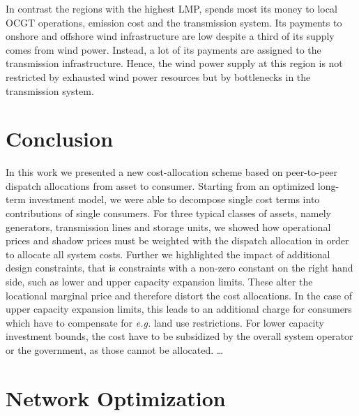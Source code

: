 \documentclass[11pt,twocolumn]{article}
\newcommand{\eg}{\textit{e.g.} }
\begin{document}
In contrast the regions with the highest LMP, spends most its money to local OCGT operations, emission cost and the transmission system. Its payments to  onshore and offshore wind infrastructure are low despite a third of its supply comes from wind power. Instead, a lot of its payments are assigned to the transmission infrastructure. Hence, the wind power supply at this region is not restricted by exhausted wind power resources but by bottlenecks in the transmission system.  

 


\section{Conclusion}

In this work we presented a new cost-allocation scheme based on peer-to-peer dispatch allocations from asset to consumer. Starting from an optimized long-term investment model, we were able to decompose single cost terms into contributions of single consumers. For three typical classes of assets, namely generators, transmission lines and storage units, we showed how operational prices and shadow prices must be weighted with the dispatch allocation in order to allocate all system costs. Further we highlighted the impact of additional design constraints, that is constraints with a non-zero constant on the right hand side, such as lower and upper capacity expansion limits. These alter the locational marginal price and therefore distort the cost allocations. In the case of upper capacity expansion limits, this leads to an additional charge for consumers which have to compensate for \eg land use restrictions. For lower capacity investment bounds, the cost have to be subsidized by the overall system operator or the government, as those cannot be allocated.
\dots
\clearpage
\appendix

\section{Network Optimization}

\renewcommand\theequation{\thesection.\arabic{equation}}
\setcounter{equation}{0}

\renewcommand\thefigure{\thesection.\arabic{figure}}    
\setcounter{figure}{0}    
\end{document}
